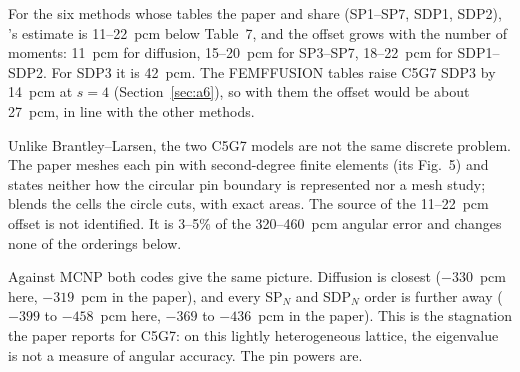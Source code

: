 For the six methods whose tables the paper and \garnet{} share (SP1--SP7,
SDP1, SDP2), \garnet's estimate is 11--22~pcm below Table~7, and the offset
grows with the number of moments: 11~pcm for diffusion, 15--20~pcm for
SP3--SP7, 18--22~pcm for SDP1--SDP2. For SDP3 it is 42~pcm. The FEMFFUSION
tables raise C5G7 SDP3 by 14~pcm at $s = 4$ (Section~\ref{sec:a6}), so with
them the offset would be about 27~pcm, in line with the other methods.

Unlike Brantley--Larsen, the two C5G7 models are not the same discrete
problem. The paper meshes each pin with second-degree finite elements
(its Fig.~5) and states neither how the circular pin boundary is represented
nor a mesh study; \garnet{} blends the cells the circle cuts, with exact
areas. The source of the 11--22~pcm offset is not identified. It is 3--5\% of
the 320--460~pcm angular error and changes none of the orderings below.

Against MCNP both codes give the same picture. Diffusion is closest
($-330$~pcm here, $-319$~pcm in the paper), and every SP$_N$ and SDP$_N$
order is further away ($-399$ to $-458$~pcm here, $-369$ to $-436$~pcm in the
paper). This is the stagnation the paper reports for C5G7: on this
lightly heterogeneous lattice, the eigenvalue is not a measure of angular
accuracy. The pin powers are.
